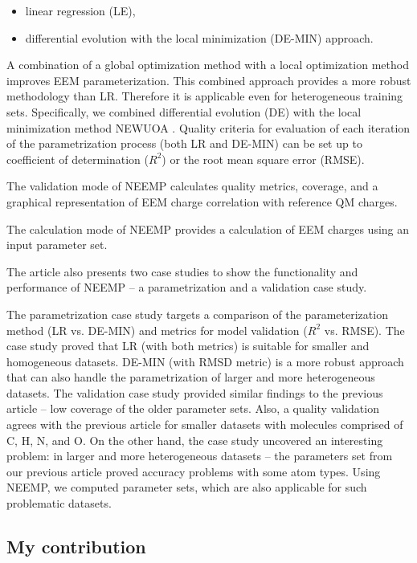 \begin{itemize}
    \item linear regression (LE),
    \item differential evolution with the local minimization (DE-MIN) approach. 
\end{itemize}

A combination of a global optimization method with a local optimization method
improves EEM parameterization. This combined approach provides a more robust
methodology than LR. Therefore it is applicable even for heterogeneous training
sets. Specifically, we combined differential evolution (DE) \cite{Storn1997} with the local
minimization method NEWUOA \cite{Zaslavski2006}. Quality criteria for evaluation of each 
iteration of the parametrization process (both LR and DE-MIN) can be set up to
coefficient of determination ($R^2$) or the root mean square error (RMSE).

The validation mode of NEEMP calculates quality metrics, coverage, and a
graphical representation of EEM charge correlation with reference QM charges.

The calculation mode of NEEMP provides a calculation of EEM charges using an
input parameter set.

The article also presents two case studies to show the functionality and
performance of NEEMP – a parametrization and a validation case study.

The parametrization case study targets a comparison of the parameterization
method (LR vs. DE-MIN) and metrics for model validation ($R^2$ vs. RMSE).
The case study proved that LR (with both metrics) is suitable for smaller
and homogeneous datasets. DE-MIN (with RMSD metric) is a more robust approach
that can also handle the parametrization of larger and more heterogeneous
da\-ta\-sets. The validation case study provided similar findings to the previous
article -- low coverage of the older parameter sets. Also, a quality validation
agrees with the previous article for smaller datasets with molecules comprised
of C, H, N, and O. On the other hand, the case study uncovered an interesting
problem: in larger and more heterogeneous datasets -- the parameters set from
our previous article proved accuracy problems with some atom types. Using NEEMP,
we computed parameter sets, which are also applicable for such problematic
datasets.

\subsection{My contribution}

